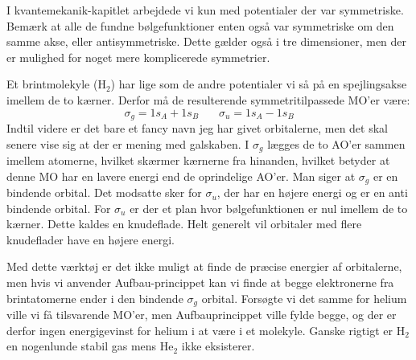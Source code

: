 \documentclass[../../Atom-ogMolekylefysik.tex]{subfiles}
\begin{document}
I kvantemekanik-kapitlet arbejdede vi kun med potentialer der var symmetriske. Bemærk at alle de fundne bølgefunktioner enten også var symmetriske om den samme akse, eller antisymmetriske. Dette gælder også i tre dimensioner, men der er mulighed for noget mere komplicerede symmetrier. 

Et brintmolekyle (H$_2$) har lige som de andre potentialer vi så på en spejlingsakse imellem de to kærner. Derfor må de resulterende symmetritilpassede MO'er være:
\begin{equation*}
    \sigma_g = 1s_A+1s_B~~~~~~~~\sigma_u = 1s_A-1s_B
\end{equation*}
Indtil videre er det bare et fancy navn jeg har givet orbitalerne, men det skal senere vise sig at der er mening med galskaben.
I $\sigma_g$ lægges de to AO'er sammen imellem atomerne, hvilket skærmer kærnerne fra hinanden, hvilket betyder at denne MO har en lavere energi end de oprindelige AO'er. Man siger at $\sigma_g$ er en bindende orbital.
Det modsatte sker for $\sigma_u$, der har en højere energi og er en anti bindende orbital.
For $\sigma_u$ er der et plan hvor bølgefunktionen er nul imellem de to kærner. Dette kaldes en knudeflade. Helt generelt vil orbitaler med flere knudeflader have en højere energi.

Med dette værktøj er det ikke muligt at finde de præcise energier af orbitalerne, men hvis vi anvender Aufbau-princippet kan vi finde at begge elektronerne fra brintatomerne ender i den bindende $\sigma_g$ orbital. Forsøgte vi det samme for helium ville vi få tilsvarende MO'er, men Aufbauprincippet ville fylde begge, og der er derfor ingen energigevinst for helium i at være i et molekyle. Ganske rigtigt er H$_2$ en nogenlunde stabil gas mens He$_2$ ikke eksisterer.
\end{document}
